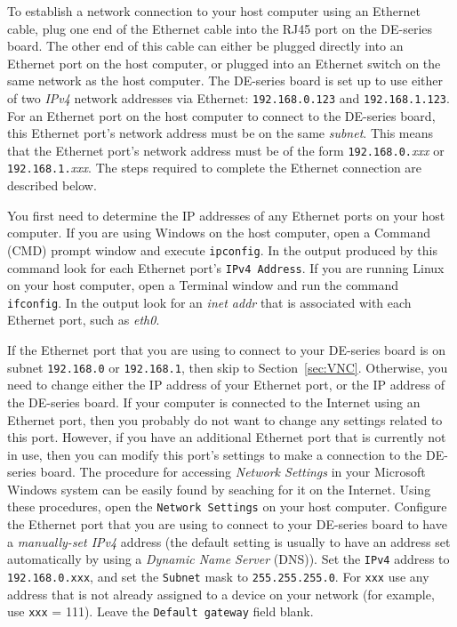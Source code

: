 \documentclass[11pt, twoside, pdftex]{article}
\begin{document}
To establish a network connection to your host computer using an Ethernet cable, plug one end 
of the Ethernet cable into the RJ45 port on the DE-series board. The other end of this cable
can either be plugged directly into an Ethernet port on the host computer, or plugged
into an Ethernet switch on the same network as the host computer. The DE-series board is set 
up to use either of two {\it IPv4} network addresses via Ethernet: \texttt{192.168.0.123} and 
\texttt{192.168.1.123}. For an Ethernet port on the host computer to connect to the DE-series
board, this Ethernet port's network address must be on the same {\it subnet}. This means 
that the Ethernet port's network address must be of the form \texttt{192.168.0.}{\it xxx} 
or \texttt{192.168.1.}{\it xxx}. The steps required to complete the Ethernet connection 
are described below.

You first need to determine the IP addresses of any Ethernet ports on your host
computer. If you are using Windows on the host computer, 
open a Command (CMD) prompt window and execute \texttt{ipconfig}. In the output produced by 
this command look for each Ethernet port's \texttt{IPv4 Address}. If you are running Linux 
on your host computer, open a Terminal window and run the command \texttt{ifconfig}. In 
the output look for an {\it inet addr} that is associated with each Ethernet port, such 
as {\it eth0}.

If the Ethernet port that you are using to connect to your DE-series board is on 
subnet \texttt{192.168.0} or \texttt{192.168.1}, then skip to 
Section~\ref{sec:VNC}.  Otherwise, you need to change either the IP address of your
Ethernet port, or the IP address of the DE-series board. If your computer is connected to
the Internet using an Ethernet port, then you probably do not want to change any
settings related to this port. However, if you have an additional Ethernet port that
is currently not in use, then you can modify this port's settings to make a connection to
the DE-series board. The procedure for accessing {\it Network Settings} in your
Microsoft Windows system can be easily found by seaching for it on the Internet. Using these
procedures, open the \texttt{Network Settings} on your host computer. 
Configure the Ethernet port that you 
are using to connect to your DE-series board to have a {\it manually-set IPv4} 
address (the default setting is usually to have an address set automatically by using a 
{\it Dynamic Name Server} (DNS)). Set the \texttt{IPv4} address 
to \texttt{192.168.0.xxx}, and set the
\texttt{Subnet} mask to \texttt{255.255.255.0}. For \texttt{xxx} use any address that is not 
already assigned to a device on your network (for example, use \texttt{xxx} = 111).
Leave the \texttt{Default gateway} field blank.
\end{document}
